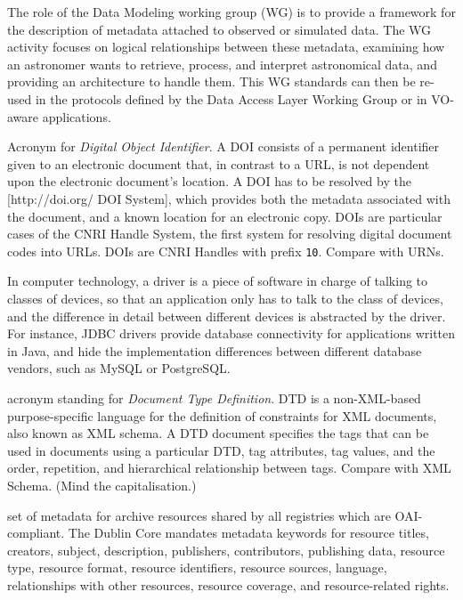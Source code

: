 {
    	The role of the Data Modeling working group (WG) is to provide
        a framework for the description of \gls{metadata} attached to
        observed or simulated data. The WG activity focuses on logical
        relationships between these metadata, examining how an
        astronomer wants to retrieve, process, and interpret
        astronomical data, and providing an architecture to handle
        them. This WG standards can then be re-used in the protocols
        defined by the \gls{Data Access Layer Working Group} or in
        VO-aware applications.
}

{
    	Acronym for \emph{Digital Object Identifier}. A DOI consists of
        a permanent identifier given to an electronic document that, in
        contrast to a \gls{URL}, is not dependent upon the electronic
        document's location. A DOI has to be resolved by the
        [http://doi.org/ DOI System], which provides both the metadata
        associated with the document, and a known location for an
        electronic copy. DOIs are particular cases of the CNRI Handle
        System, the first system for resolving digital document codes
        into URLs. DOIs are CNRI Handles with prefix \texttt{10}.
        Compare with \gls{URN}s.
}

{
    	In computer technology, a driver is a piece of software in
        charge of talking to classes of devices, so that an application
        only has to talk to the class of devices, and the difference in
        detail between different devices is abstracted by the driver.
        For instance, \gls{JDBC} drivers provide database connectivity
        for applications written in \gls{Java}, and hide the
        implementation differences between different database vendors,
        such as MySQL or PostgreSQL.
}

{
    	acronym standing for \emph{Document Type Definition}. DTD is a
        non-XML-based purpose-specific language for the definition of
        constraints for \gls{XML} documents, also known as \gls{XML
        schema}. A DTD document specifies the \gls{tags} that can be
        used in documents using a particular DTD, tag \gls{attributes},
        tag values, and the order, repetition, and hierarchical
        relationship between tags. Compare with \gls{XML Schema}. (Mind
        the capitalisation.)
}

{
    	set of \gls{metadata} for archive resources shared by all
        registries which are \gls{OAI}-compliant. The Dublin Core
        mandates metadata keywords for resource titles, creators,
        subject, description, publishers, contributors, publishing
        data, resource type, resource format, resource identifiers,
        resource sources, language, relationships with other resources,
        resource coverage, and resource-related rights.
}

